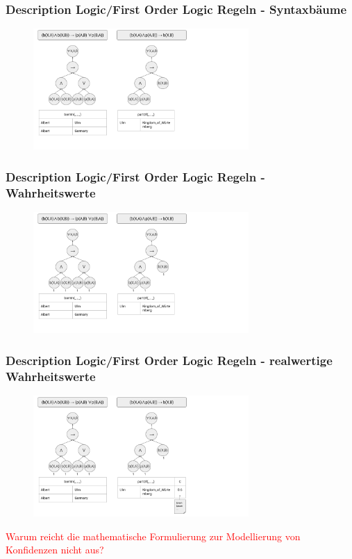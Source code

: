 \documentclass[aspectratio=169]{beamer}
\begin{document}
\begin{frame}\frametitle{Description Logic/First Order Logic Regeln - Syntaxbäume}
\begin{figure}
    \centering
    \includegraphics[width=0.73\textwidth]{4_LNN.png}
\end{figure}
\end{frame}

\begin{frame}\frametitle{Description Logic/First Order Logic Regeln - Wahrheitswerte}
\begin{figure}
    \centering
    \includegraphics[width=0.73\textwidth]{5_LNN.png}
\end{figure}
\end{frame}

\begin{frame}\frametitle{Description Logic/First Order Logic Regeln - realwertige Wahrheitswerte}
\begin{figure}
    \centering
    \includegraphics[width=0.73\textwidth]{6_LNN.png}
\end{figure}

\textcolor{red}{Warum reicht die mathematische Formulierung zur Modellierung von Konfidenzen nicht aus?}
\end{frame}
\end{document}
